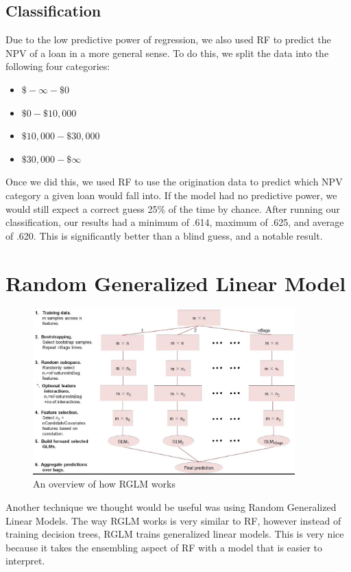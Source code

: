 \documentclass[12 pt]{uncw_thesis}
\theoremstyle{plain}
\theoremstyle{remark}
\theoremstyle{definition}
\begin{document}
\subsection{Classification}
Due to the low predictive power of regression, we also used RF to predict the NPV of a loan in a more general sense. To do this, we split the data into the following four categories: 
\begin{itemize}
	\item $\$-\infty - \$0$
	\item $\$0 - \$10,000$
	\item $\$10,000 - \$30,000$
	\item $\$30,000 - \$\infty$
\end{itemize}
Once we did this, we used RF to use the origination data to predict which NPV category a given loan would fall into. If the model had no predictive power, we would still expect a correct guess 25\% of the time by chance. After running our classification, our results had a minimum of .614, maximum of .625, and average of .620. This is significantly better than a blind guess, and a notable result. 
\section{Random Generalized Linear Model}
\begin{figure}
	\includegraphics[width=0.9\textwidth]{images/RGLM.jpg}
	\caption{An overview of how RGLM works \cite{RGLM}}
	\label{fig:RGLM}
\end{figure}
Another technique we thought would be useful was using Random Generalized Linear Models. The way RGLM works is very similar to RF, however instead of training decision trees, RGLM trains generalized linear models. This is very nice because it takes the ensembling aspect of RF with a model that is easier to interpret.
\end{document}
